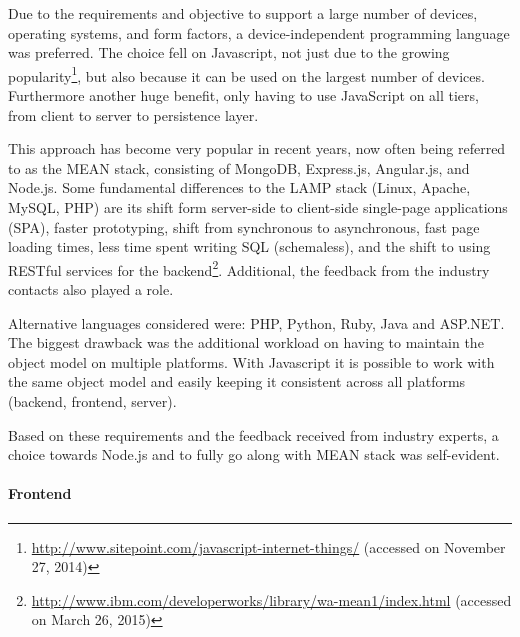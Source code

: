 		Due to the requirements and objective to support a large number of devices, operating systems, and form factors, a device-independent programming language was preferred. 
		The choice fell on Javascript, not just due to the growing popularity\footnote{\url{http://www.sitepoint.com/javascript-internet-things/} (accessed on November 27, 2014)}, but also because it can be used on the largest number of devices. Furthermore another huge benefit, only having to use JavaScript on all tiers, from client to server to persistence layer.

		This approach has become very popular in recent years, now often being referred to as the MEAN stack, consisting of MongoDB, Express.js, Angular.js, and Node.js. Some fundamental differences to the LAMP stack (Linux, Apache, MySQL, PHP) are its shift form server-side to client-side single-page applications (SPA), faster prototyping, shift from synchronous to asynchronous, fast page loading times, less time spent writing SQL (schemaless), and the shift to using RESTful services for the backend\footnote{\url{http://www.ibm.com/developerworks/library/wa-mean1/index.html} (accessed on March 26, 2015)}. Additional, the feedback from the industry contacts also played a role. 

		Alternative languages considered were: PHP, Python, Ruby, Java and ASP.NET. The biggest drawback was the additional workload on having to maintain the object model on multiple platforms. With Javascript it is possible to work with the same object model and easily keeping it consistent across all platforms (backend, frontend, server).


				Based on these requirements and the feedback received from industry experts, a choice towards Node.js and to fully go along with MEAN stack was self-evident.



	\paragraph{Frontend}


